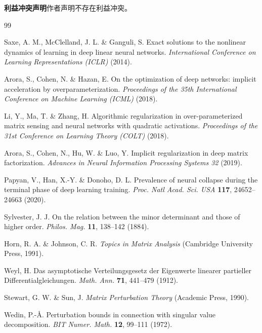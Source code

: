 \documentclass[UTF8,11pt,a4paper]{ctexart}
\theoremstyle{plain}
\theoremstyle{definition}
\theoremstyle{remark}
\begin{document}
\noindent\textbf{利益冲突声明}\quad 作者声明不存在利益冲突。

\begin{thebibliography}{99}\small

 Saxe, A. M., McClelland, J. L. \& Ganguli, S.
Exact solutions to the nonlinear dynamics of learning in deep linear neural networks.
\emph{International Conference on Learning Representations (ICLR)} (2014).

 Arora, S., Cohen, N. \& Hazan, E.
On the optimization of deep networks: implicit acceleration by overparameterization.
\emph{Proceedings of the 35th International Conference on Machine Learning (ICML)} (2018).

 Li, Y., Ma, T. \& Zhang, H.
Algorithmic regularization in over-parameterized matrix sensing and neural networks
with quadratic activations. \emph{Proceedings of the 31st Conference on Learning
Theory (COLT)} (2018).

 Arora, S., Cohen, N., Hu, W. \& Luo, Y.
Implicit regularization in deep matrix factorization.
\emph{Advances in Neural Information Processing Systems 32} (2019).

 Papyan, V., Han, X.-Y. \& Donoho, D. L.
Prevalence of neural collapse during the terminal phase of deep learning training.
\emph{Proc. Natl Acad. Sci. USA} \textbf{117}, 24652--24663 (2020).

 Sylvester, J. J.
On the relation between the minor determinant and those of higher order.
\emph{Philos. Mag.} \textbf{11}, 138--142 (1884).

 Horn, R. A. \& Johnson, C. R.
\emph{Topics in Matrix Analysis} (Cambridge University Press, 1991).

 Weyl, H.
Das asymptotische Verteilungsgesetz der Eigenwerte linearer partieller
Differentialgleichungen. \emph{Math. Ann.} \textbf{71}, 441--479 (1912).

 Stewart, G. W. \& Sun, J.
\emph{Matrix Perturbation Theory} (Academic Press, 1990).

 Wedin, P.-\AA.
Perturbation bounds in connection with singular value decomposition.
\emph{BIT Numer. Math.} \textbf{12}, 99--111 (1972).


\end{thebibliography}
\end{document}

